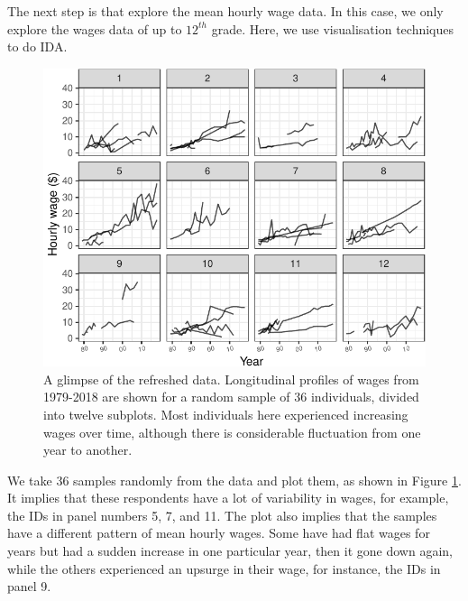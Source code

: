 \documentclass{article}
\begin{document}
The next step is that explore the mean hourly wage data. In this case, we only explore the wages data of up to \(12^{th}\) grade. Here, we use visualisation techniques to do IDA.

\begin{figure}

{\centering \includegraphics[width=1\linewidth]{figures/sample-plot-1} 

}

\caption{A glimpse of the refreshed data. Longitudinal profiles of wages from 1979-2018 are shown for a random sample of 36 individuals, divided into twelve subplots. Most individuals here experienced increasing wages over time, although there is considerable fluctuation from one year to another.}\label{fig:sample-plot}
\end{figure}

We take 36 samples randomly from the data and plot them, as shown in Figure \ref{fig:sample-plot}. It implies that these respondents have a lot of variability in wages, for example, the IDs in panel numbers 5, 7, and 11. The plot also implies that the samples have a different pattern of mean hourly wages. Some have had flat wages for years but had a sudden increase in one particular year, then it gone down again, while the others experienced an upsurge in their wage, for instance, the IDs in panel 9.
\end{document}

